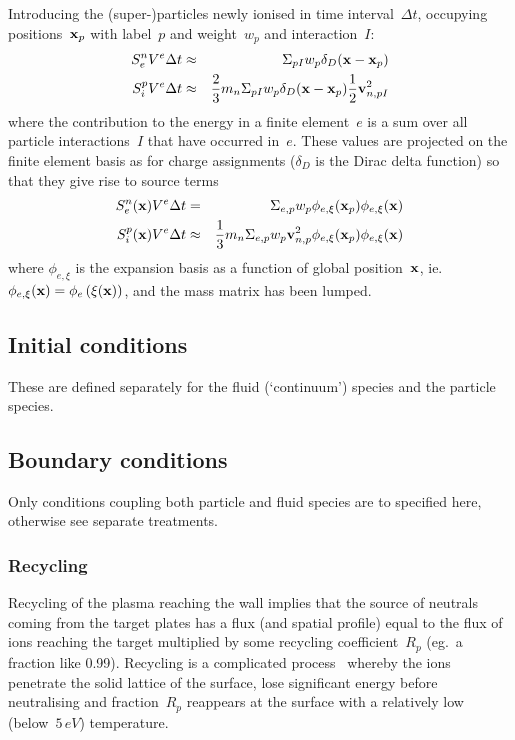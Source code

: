 Introducing the (super-)particles newly ionised in time interval~$\Delta t$, occupying
positions~${\bf x}_p$ with label~$p$ and weight~$w_p$ and interaction~$I$:
\begin{eqnarray}\label{eq:Spartion}
S^{n}_e V^e \Delta t & \approx & \Sigma_{pI} w_p\delta_D({\bf x}-{\bf x}_p) \\
S^{p}_i V^e \Delta t & \approx &\frac{2}{3} m_n \Sigma_{pI} w_p\delta_D({\bf x}-{\bf x}_p) \frac{1}{2} \mathbf{v}_{n,pI}^2
\end{eqnarray}
where the contribution to the energy in a finite element~$e$ is a sum over all particle
interactions~$I$ that have occurred in~$e$. These values are projected
on the finite element basis as for charge assignments
($\delta_D$ is the Dirac delta function) so that they give rise to source terms
\begin{eqnarray}\label{eq:Sfluidion}
S^{n}_e({\bf x}) V^e \Delta t & = & \Sigma_{e,p} w_p\phi_{e,\xi}({\bf x}_p) \phi_{e,\xi}({\bf x}) \\
S^{p}_i({\bf x})  V^e \Delta t & \approx &\frac{1}{3} m_n \Sigma_{e,p} w_p
\mathbf{v}_{n,p}^2 \phi_{e,\xi}({\bf x}_p) \phi_{e,\xi}({\bf x})
\end{eqnarray}
where $\phi_{e,\xi}$ is the expansion basis as a function of global
position~${\bf x}$, ie.\ $\phi_{e,\xi}({\bf x})=\phi_e\left({\boldmath \xi}({\bf x})\right)$,
and the mass matrix has been lumped. %

\subsection{Initial conditions}\label{sec:33init}
These are defined separately for the fluid (`continuum') species
and the particle species.
\subsection{Boundary conditions}\label{sec:33bcs}
Only conditions coupling both particle and fluid species are
to specified here, otherwise see separate treatments.
\subsubsection{Recycling}\label{sec:33recyc}
Recycling of the plasma reaching the wall implies
that the source of neutrals coming from the target
plates has a flux (and spatial profile) equal to the flux of ions
reaching the target multiplied by some recycling coefficient~$R_p$ (eg.\
a fraction like 0.99).
Recycling is a complicated process~\cite[\S\,9.4]{wesson}
whereby the ions penetrate the solid lattice of the surface, lose
significant energy before neutralising and fraction~$R_p$ reappears
at the surface with a relatively low (below~$5$\,$eV$) temperature.

